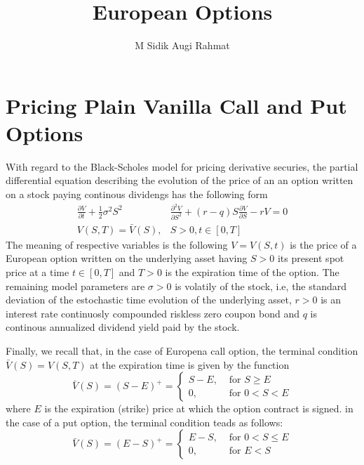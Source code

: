 \documentclass[a4paper]{article}
\title{European Options}
\date{}
\author{M Sidik Augi Rahmat}
\begin{document}
\maketitle
\section{Pricing Plain Vanilla Call and Put Options}
With regard to the Black-Scholes model for pricing derivative securies, the partial differential equation describing the evolution of the price of an
an option written on a stock paying continous dividengs has the following form
\begin{equation}
    \begin{aligned}
    \frac{\partial V}{\partial t}+\frac{1}{2} \sigma^{2} S^{2} & \frac{\partial^{2} V}{\partial S^{2}}+(r-q) S \frac{\partial V}{\partial S}-r V =0 \\
    V(S, T)=\bar{V}(S), & S>0, t \in[0, T]
    \end{aligned}
    \label{eq:1}
\end{equation}
The meaning of respective variables is the following $V = V(S, t)$ is the price of a European option written on the underlying asset having $S>0$ its present 
spot price at a time $t \in [0, T]$ and $T>0$ is the expiration time of the option. The remaining model parameters are $\sigma > 0$ is volatily of the stock, 
i.e, the standard deviation of the estochastic time evolution of the underlying asset, $r > 0$ is an interest rate continuosly compounded riskless zero coupon bond and $q$ is continous annualized dividend
yield paid by the stock. \par 
Finally, we recall that, in the case of Europena call option, the terminal condition $\bar{V}(S)= V(S,T)$ at the expiration time is given by the function
\begin{equation}
    \bar{V}(S)=(S-E)^{+}=\left\{\begin{array}{ll}
    {S-E,} & {\text { for } S \geq E} \\
    {0,} & {\text { for } 0<S<E}
    \end{array}\right.
\end{equation}
where $E$ is the expiration (strike) price at which the option contract is signed. in the case of a put option, the terminal condition teads as follows:
\begin{equation}
    \bar{V}(S)=(E-S)^{+}=\left\{\begin{array}{ll}
    {E-S,} & {\text { for } 0<S \leq E} \\
    {0,} & {\text { for } E<S}
    \end{array}\right.
\end{equation}
\end{document}
